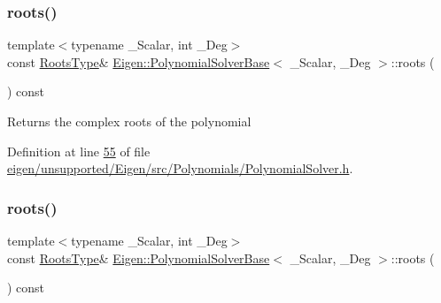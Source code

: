 \mbox{\label{class_eigen_1_1_polynomial_solver_base_a07bcd5339be5eacdf7e566d07d81bedb}} 
\subsubsection{\texorpdfstring{roots()}{roots()}\hspace{0.1cm}{\footnotesize\ttfamily [1/2]}}
{\footnotesize\ttfamily template$<$typename \+\_\+\+Scalar, int \+\_\+\+Deg$>$ \\
const \hyperlink{group___core___module}{Roots\+Type}\& \hyperlink{class_eigen_1_1_polynomial_solver_base}{Eigen\+::\+Polynomial\+Solver\+Base}$<$ \+\_\+\+Scalar, \+\_\+\+Deg $>$\+::roots (\begin{DoxyParamCaption}{ }\end{DoxyParamCaption}) const\hspace{0.3cm}{\ttfamily [inline]}}

\begin{DoxyReturn}{Returns}
the complex roots of the polynomial 
\end{DoxyReturn}


Definition at line \hyperlink{eigen_2unsupported_2_eigen_2src_2_polynomials_2_polynomial_solver_8h_source_l00055}{55} of file \hyperlink{eigen_2unsupported_2_eigen_2src_2_polynomials_2_polynomial_solver_8h_source}{eigen/unsupported/\+Eigen/src/\+Polynomials/\+Polynomial\+Solver.\+h}.

\mbox{\label{class_eigen_1_1_polynomial_solver_base_a07bcd5339be5eacdf7e566d07d81bedb}} 
\subsubsection{\texorpdfstring{roots()}{roots()}\hspace{0.1cm}{\footnotesize\ttfamily [2/2]}}
{\footnotesize\ttfamily template$<$typename \+\_\+\+Scalar, int \+\_\+\+Deg$>$ \\
const \hyperlink{group___core___module}{Roots\+Type}\& \hyperlink{class_eigen_1_1_polynomial_solver_base}{Eigen\+::\+Polynomial\+Solver\+Base}$<$ \+\_\+\+Scalar, \+\_\+\+Deg $>$\+::roots (\begin{DoxyParamCaption}{ }\end{DoxyParamCaption}) const\hspace{0.3cm}{\ttfamily [inline]}}

